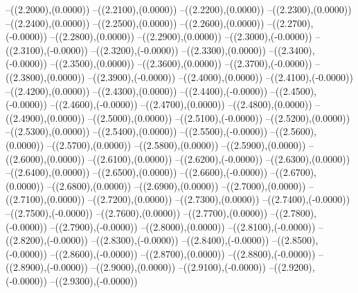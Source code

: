 {	--({\sx*(2.2000)},{\sy*(0.0000)})
	--({\sx*(2.2100)},{\sy*(0.0000)})
	--({\sx*(2.2200)},{\sy*(0.0000)})
	--({\sx*(2.2300)},{\sy*(0.0000)})
	--({\sx*(2.2400)},{\sy*(0.0000)})
	--({\sx*(2.2500)},{\sy*(0.0000)})
	--({\sx*(2.2600)},{\sy*(0.0000)})
	--({\sx*(2.2700)},{\sy*(-0.0000)})
	--({\sx*(2.2800)},{\sy*(0.0000)})
	--({\sx*(2.2900)},{\sy*(0.0000)})
	--({\sx*(2.3000)},{\sy*(-0.0000)})
	--({\sx*(2.3100)},{\sy*(-0.0000)})
	--({\sx*(2.3200)},{\sy*(-0.0000)})
	--({\sx*(2.3300)},{\sy*(0.0000)})
	--({\sx*(2.3400)},{\sy*(-0.0000)})
	--({\sx*(2.3500)},{\sy*(0.0000)})
	--({\sx*(2.3600)},{\sy*(0.0000)})
	--({\sx*(2.3700)},{\sy*(-0.0000)})
	--({\sx*(2.3800)},{\sy*(0.0000)})
	--({\sx*(2.3900)},{\sy*(-0.0000)})
	--({\sx*(2.4000)},{\sy*(0.0000)})
	--({\sx*(2.4100)},{\sy*(-0.0000)})
	--({\sx*(2.4200)},{\sy*(0.0000)})
	--({\sx*(2.4300)},{\sy*(0.0000)})
	--({\sx*(2.4400)},{\sy*(-0.0000)})
	--({\sx*(2.4500)},{\sy*(-0.0000)})
	--({\sx*(2.4600)},{\sy*(-0.0000)})
	--({\sx*(2.4700)},{\sy*(0.0000)})
	--({\sx*(2.4800)},{\sy*(0.0000)})
	--({\sx*(2.4900)},{\sy*(0.0000)})
	--({\sx*(2.5000)},{\sy*(0.0000)})
	--({\sx*(2.5100)},{\sy*(-0.0000)})
	--({\sx*(2.5200)},{\sy*(0.0000)})
	--({\sx*(2.5300)},{\sy*(0.0000)})
	--({\sx*(2.5400)},{\sy*(0.0000)})
	--({\sx*(2.5500)},{\sy*(-0.0000)})
	--({\sx*(2.5600)},{\sy*(0.0000)})
	--({\sx*(2.5700)},{\sy*(0.0000)})
	--({\sx*(2.5800)},{\sy*(0.0000)})
	--({\sx*(2.5900)},{\sy*(0.0000)})
	--({\sx*(2.6000)},{\sy*(0.0000)})
	--({\sx*(2.6100)},{\sy*(0.0000)})
	--({\sx*(2.6200)},{\sy*(-0.0000)})
	--({\sx*(2.6300)},{\sy*(0.0000)})
	--({\sx*(2.6400)},{\sy*(0.0000)})
	--({\sx*(2.6500)},{\sy*(0.0000)})
	--({\sx*(2.6600)},{\sy*(-0.0000)})
	--({\sx*(2.6700)},{\sy*(0.0000)})
	--({\sx*(2.6800)},{\sy*(0.0000)})
	--({\sx*(2.6900)},{\sy*(0.0000)})
	--({\sx*(2.7000)},{\sy*(0.0000)})
	--({\sx*(2.7100)},{\sy*(0.0000)})
	--({\sx*(2.7200)},{\sy*(0.0000)})
	--({\sx*(2.7300)},{\sy*(0.0000)})
	--({\sx*(2.7400)},{\sy*(-0.0000)})
	--({\sx*(2.7500)},{\sy*(-0.0000)})
	--({\sx*(2.7600)},{\sy*(0.0000)})
	--({\sx*(2.7700)},{\sy*(0.0000)})
	--({\sx*(2.7800)},{\sy*(-0.0000)})
	--({\sx*(2.7900)},{\sy*(-0.0000)})
	--({\sx*(2.8000)},{\sy*(0.0000)})
	--({\sx*(2.8100)},{\sy*(-0.0000)})
	--({\sx*(2.8200)},{\sy*(-0.0000)})
	--({\sx*(2.8300)},{\sy*(-0.0000)})
	--({\sx*(2.8400)},{\sy*(-0.0000)})
	--({\sx*(2.8500)},{\sy*(-0.0000)})
	--({\sx*(2.8600)},{\sy*(-0.0000)})
	--({\sx*(2.8700)},{\sy*(0.0000)})
	--({\sx*(2.8800)},{\sy*(-0.0000)})
	--({\sx*(2.8900)},{\sy*(-0.0000)})
	--({\sx*(2.9000)},{\sy*(0.0000)})
	--({\sx*(2.9100)},{\sy*(-0.0000)})
	--({\sx*(2.9200)},{\sy*(-0.0000)})
	--({\sx*(2.9300)},{\sy*(-0.0000)})
}
